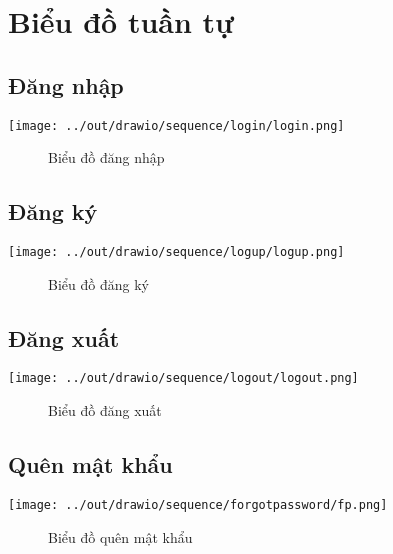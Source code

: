 \section{Biểu đồ tuần tự}

  \subsection{Đăng nhập}
    \begin{center}
      \texttt{[image: ../out/drawio/sequence/login/login.png]}
      \begin{figure}[h]
        \centering
        \caption{Biểu đồ đăng nhập}
      \end{figure}
    \end{center}

  \subsection{Đăng ký}
    \begin{center}
      \texttt{[image: ../out/drawio/sequence/logup/logup.png]}
      \begin{figure}[h]
        \centering
        \caption{Biểu đồ đăng ký}
      \end{figure}
    \end{center}

  \subsection{Đăng xuất}
    \begin{center}
      \texttt{[image: ../out/drawio/sequence/logout/logout.png]}
      \begin{figure}[h]
        \centering
        \caption{Biểu đồ đăng xuất}
      \end{figure}
    \end{center}

  \subsection{Quên mật khẩu}
    \begin{center}
      \texttt{[image: ../out/drawio/sequence/forgotpassword/fp.png]}
      \begin{figure}[h]
        \centering
        \caption{Biểu đồ quên mật khẩu}
      \end{figure}
    \end{center}

